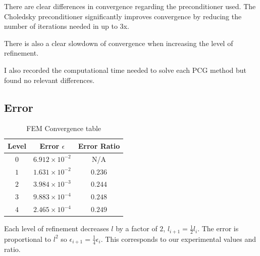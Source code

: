 \documentclass[a4paper, 11pt]{article}
\begin{document}
				There are clear differences in convergence regarding the preconditioner used.
				The Choledsky preconditioner significantly improves convergence by reducing the number of iterations needed in up to 3x.
				
				There is also a clear slowdown of convergence when increasing the level of refinement.
			
				I also recorded the computational time needed to solve each PCG method but found no relevant differences.
				
			\subsection{Error}
				\begin{table}[H]
					\centering
					\begin{tabular}{c|c|c}         
						\textbf{Level} 	& \textbf{ Error $ \epsilon $} 		& \textbf{Error Ratio}  \\ \hline
						$ 0  $			& $ 6.912 \times 10^{-2} $ 	& N/A \\ \hline
						$ 1  $			& $ 1.631 \times 10^{-2} $ 	& $ 0.236 $ \\ \hline
						$ 2  $			& $ 3.984 \times 10^{-3} $ 	& $ 0.244 $ \\ \hline
						$ 3  $			& $ 9.883 \times 10^{-4} $	& $ 0.248 $ \\ \hline
						$ 4  $			& $ 2.465 \times 10^{-4} $ 	& $ 0.249 $ \\ 
					\end{tabular}
					\caption{FEM Convergence table}
					\label{table:errors}
				\end{table}
				Each level of refinement decreases $ l $ by a factor of $ 2 $, $ l_{i+1} = \frac{1}{2}l_i $.
				The error is proportional to $l^2$ so $ \epsilon_{i+1} = \frac{1}{4}\epsilon_i $.
				This corresponds to our experimental values and ratio.
	
	
\end{document}
